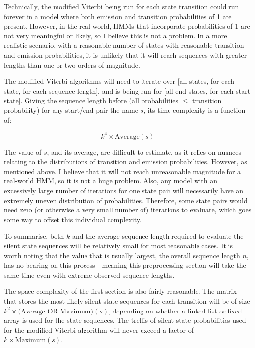 \documentclass[11pt]{article} %
\begin{document}
Technically, the modified Viterbi being run for each state transition could run forever in a model where both emission and transition probabilities of 1 are present. However, in the real world, HMMs that incorporate probabilities of 1 are not very meaningful or likely, so I believe this is not a problem. In a more realistic scenario, with a reasonable number of states with reasonable transition and emission probabilities, it is unlikely that it will reach sequences with greater lengths than one or two orders of magnitude.

The modified Viterbi algorithms will need to iterate over [all states, for each state, for each sequence length], and is being run for [all end states, for each start state]. Giving the sequence length before (all probabilities $\leq$ transition probability) for any start/end pair the name $s$, its time complexity is a function of:

$$k^4 \times \text{Average}(s)$$

The value of $s$, and its average, are difficult to estimate, as it relies on nuances relating to the distributions of transition and emission probabilities. However, as mentioned above, I believe that it will not reach unreasonable magnitude for a real-world HMM, so it is not a huge problem. Also, any model with an excessively large number of iterations for one state pair will necessarily have an extremely uneven distribution of probabilities. Therefore, some state pairs would need zero (or otherwise a very small number of) iterations to evaluate, which goes some way to offset this individual complexity.

To summarise, both $k$ and the average sequence length required to evaluate the silent state sequences will be relatively small for most reasonable cases. It is worth noting that the value that is usually largest, the overall sequence length $n$, has no bearing on this process - meaning this preprocessing section will take the same time even with extreme observed sequence lengths.

\hfill

The space complexity of the first section is also fairly reasonable. The matrix that stores the most likely silent state sequences for each transition will be of size $k^2 \times \text{(Average OR Maximum)}(s)$, depending on whether a linked list or fixed array is used for the state sequences. The trellis of silent state probabilities used for the modified Viterbi algorithm will never exceed a factor of $k \times \text{Maximum}(s)$.
\end{document}

